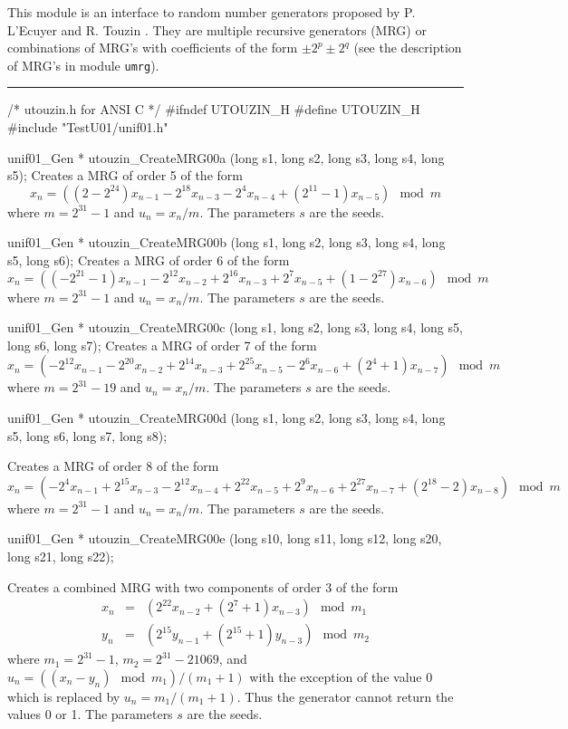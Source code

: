 
This module is an interface to random number generators proposed by
P. L'Ecuyer and R. Touzin \cite{rTOU01a}.
They are multiple recursive generators (MRG) or combinations of MRG's
with coefficients of the form $\pm2^p \pm 2^q$
(see the description of MRG's in module {\tt umrg}).


\bigskip\hrule
\code\hide
/*  utouzin.h  for ANSI C */
#ifndef UTOUZIN_H
#define UTOUZIN_H
\endhide
#include "TestU01/unif01.h"


unif01_Gen * utouzin_CreateMRG00a (long s1, long s2, long s3, long s4,
                                   long s5);
\endcode
  \tab Creates a MRG of order 5 of the form
$$
x_n = \left((2 -2^{24})x_{n-1} - 2^{18}x_{n-3} - 2^{4}x_{n-4}
  + (2^{11} - 1)x_{n-5}\right) \mod m
$$
where $ m = 2^{31} - 1$ and $u_n = x_n/m$. The parameters $s$ are the seeds.
 \endtab
\code


unif01_Gen * utouzin_CreateMRG00b (long s1, long s2, long s3, long s4,
                                   long s5, long s6);
\endcode
  \tab Creates a MRG of order 6 of the form
$$
x_n = \left((-2^{21} - 1)x_{n-1} - 2^{12}x_{n-2} + 2^{16}x_{n-3}
  + 2^{7}x_{n-5} + (1 - 2^{27})x_{n-6}\right) \mod m
$$
where $ m = 2^{31} - 1$ and $u_n = x_n/m$. The parameters $s$ are the seeds.
 \endtab
\code


unif01_Gen * utouzin_CreateMRG00c (long s1, long s2, long s3, long s4,
                                   long s5, long s6, long s7);
\endcode
  \tab Creates a MRG of order 7 of the form
$$
x_n = \left(-2^{12}x_{n-1} - 2^{20}x_{n-2} + 2^{14}x_{n-3}
  + 2^{25}x_{n-5} - 2^{6}x_{n-6} + (2^4 + 1)x_{n-7}\right) \mod m
$$
where $ m = 2^{31} - 19$ and $u_n = x_n/m$. The parameters $s$ are the seeds.
 \endtab
\code


unif01_Gen * utouzin_CreateMRG00d (long s1, long s2, long s3, long s4,
                                   long s5, long s6, long s7, long s8);

\endcode
  \tab Creates a MRG of order 8 of the form
$$
x_n = \left(-2^{4}x_{n-1} + 2^{15}x_{n-3} - 2^{12}x_{n-4} + 2^{22}x_{n-5} +
   2^{9}x_{n-6} + 2^{27}x_{n-7} + (2^{18} - 2)x_{n-8}\right) \mod m
$$
where $ m = 2^{31} - 1$ and $u_n = x_n/m$. The parameters $s$ are the seeds.
 \endtab
\code


unif01_Gen * utouzin_CreateMRG00e (long s10, long s11, long s12,
                                   long s20, long s21, long s22);

\endcode
  \tab Creates a combined MRG with two components of order 3 of the form
\begin{eqnarray*}
x_n &=& \left(2^{22}x_{n-2}  + (2^{7} + 1)x_{n-3}\right) \mod m_1 \\
y_n &=& \left(2^{15}y_{n-1}  + (2^{15} + 1)y_{n-3}\right) \mod m_2
\end{eqnarray*}
where $m_1 = 2^{31} - 1$, $m_2 = 2^{31} - 21069$,  and $u_n =
 \left((x_n - y_n)\mod m_1 \right)/(m_1+1)$ with the exception of the value
0 which is replaced by $u_n = m_1 /(m_1+1)$.  Thus the generator cannot return
the values 0 or 1.
 The parameters $s$ are the seeds.
 \endtab
\code


